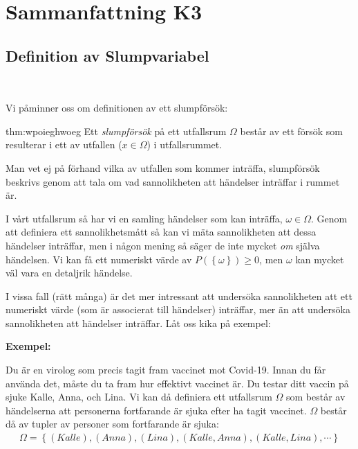\section{Sammanfattning K3}\par
\subsection{Definition av Slumpvariabel}\hfill\\\par
\noindent Vi påminner oss om definitionen av ett slumpförsök:
\par\bigskip
\begin{theo}[Slumpförsök]{thm:wpoieghwoeg}
  Ett \textit{slumpförsök} på ett utfallsrum $\Omega$ består av ett försök som resulterar i ett av utfallen ($x\in\Omega$) i utfallsrummet.\par\bigskip
  \noindent Man vet ej på förhand vilka av utfallen som kommer inträffa, slumpförsök beskrivs genom att tala om vad sannolikheten att händelser inträffar i rummet är.
\end{theo}
\par\bigskip
\noindent I vårt utfallsrum så har vi en samling händelser som kan inträffa, $\omega\in\Omega$. Genom att definiera ett sannolikhetsmått så kan vi mäta sannolikheten att dessa händelser inträffar, men i någon mening så säger de inte mycket \textit{om} själva händelsen. Vi kan få ett numeriskt värde av $P(\left\{\omega\right\})\geq0$, men $\omega$ kan mycket väl vara en detaljrik händelse.
\par\bigskip
\noindent I vissa fall (rätt många) är det mer intressant att undersöka sannolikheten att ett numeriskt värde (som är associerat till händelser) inträffar, mer än att undersöka sannolikheten att händelser inträffar. Låt oss kika på exempel:
\par\bigskip
\noindent\textbf{Exempel:}\par
\noindent Du är en virolog som precis tagit fram vaccinet mot Covid-19. Innan du får använda det, måste du ta fram hur effektivt vaccinet är. Du testar ditt vaccin på sjuke Kalle, Anna, och Lina. Vi kan då definiera ett utfallsrum $\Omega$ som består av händelserna att personerna fortfarande är sjuka efter ha tagit vaccinet. $\Omega$ består då av tupler av personer som fortfarande är sjuka:
\begin{equation*}
  \begin{gathered}
    \Omega = \left\{(Kalle), (Anna), (Lina), (Kalle, Anna), (Kalle, Lina),\cdots\right\}
  \end{gathered}
\end{equation*}\par
